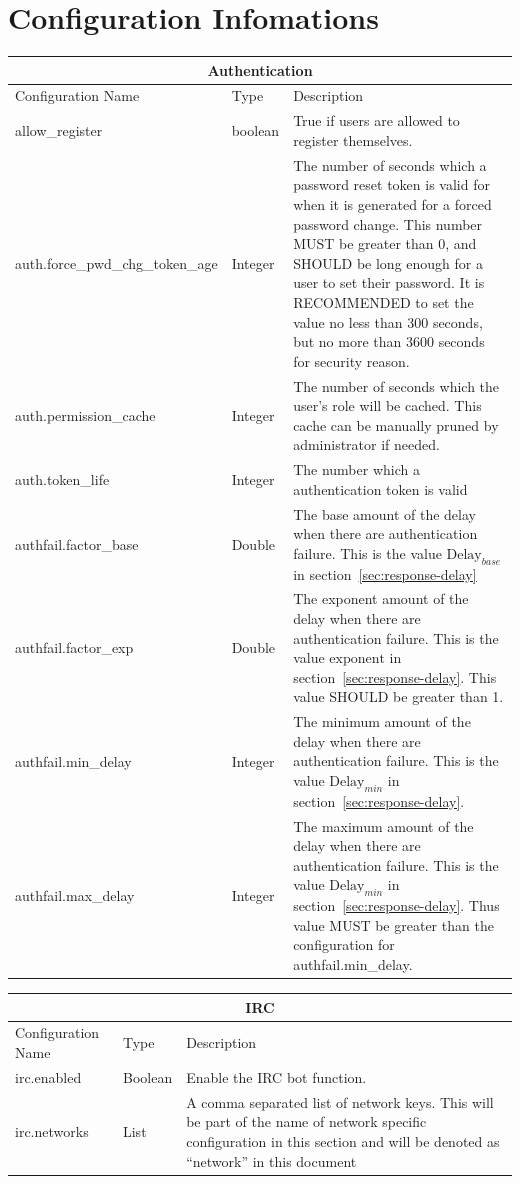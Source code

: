 \documentclass[12pt]{report}
\begin{document}
    \section{Configuration Infomations}\label{sec:configuration-infomations}
    \begin{longtable}{|p{}|p{}|p{}|}\hline
    \multicolumn{3}{|c|}{Authentication}\\\hline
    Configuration Name & Type & Description \\\hline\endhead
    allow\_register & boolean & True if users are allowed to register themselves. \\\hline
    auth.force\_pwd\_chg\_token\_age & Integer & The number of seconds which a password reset token is valid for
    when it is generated for a forced password change.
    This number MUST be greater than 0, and SHOULD be long enough for a user to set their password.
    It is RECOMMENDED to set the value no less than 300 seconds, but no more than 3600 seconds for security reason.
    \\\hline
    auth.permission\_cache & Integer & The number of seconds which the user's role will be cached.
    This cache can be manually pruned by administrator if needed.\\\hline
    auth.token\_life & Integer & The number which a authentication token is valid  \\\hline
    authfail.factor\_base & Double & The base amount of the delay when there are authentication failure.
    This is the value $\mbox{Delay}_{base}$ in section~\ref{sec:response-delay}\\\hline
    authfail.factor\_exp & Double & The exponent amount of the delay when there are authentication failure.
    This is the value $\mbox{exponent}$ in section~\ref{sec:response-delay}.
    This value SHOULD be greater than 1. \\\hline
    authfail.min\_delay & Integer & The minimum amount of the delay when there are authentication failure.
    This is the value $\mbox{Delay}_{min}$ in section~\ref{sec:response-delay}. \\\hline
    authfail.max\_delay& Integer &  The maximum amount of the delay when there are authentication failure.
    This is the value $\mbox{Delay}_{min}$ in section~\ref{sec:response-delay}.
    Thus value MUST be greater than the configuration for authfail.min\_delay. \\\hline
    \end{longtable}
    \begin{longtable}{|p{}|p{}|p{}|}\hline
    \multicolumn{3}{|c|}{IRC}\\\hline
    Configuration Name & Type & Description \\\hline\endhead
        irc.enabled & Boolean & Enable the IRC bot function.\\\hline
        irc.networks & List & A comma separated list of network keys.
        This will be part of the name of network specific configuration in this section and will be denoted as
        ``network'' in this document\\\hline
    \end{longtable}
\end{document}
